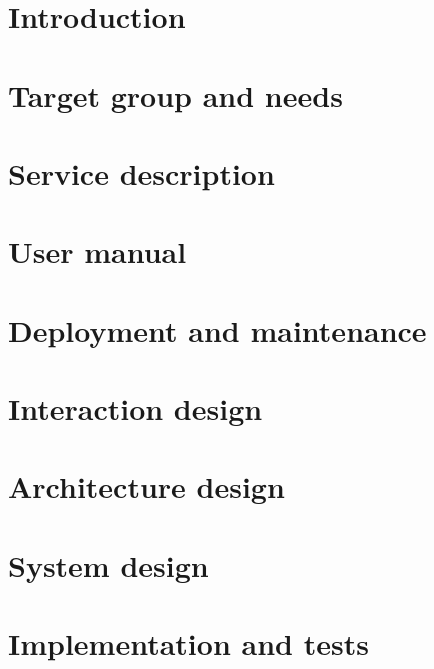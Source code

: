 \documentclass[a4paper]{report}
\begin{document}
\setcounter{secnumdepth}{5}

\setlength{\parindent}{0pt}
\setlength{\parskip}{10pt}

\graphicspath{ {figures/} }

\tableofcontents

\chapter{Introduction}


\chapter{Target group and needs}


\chapter{Service description}


\chapter{User manual}


\chapter{Deployment and maintenance}


\chapter{Interaction design}


\chapter{Architecture design}


\chapter{System design}


\chapter{Implementation and tests}




\end{document}
